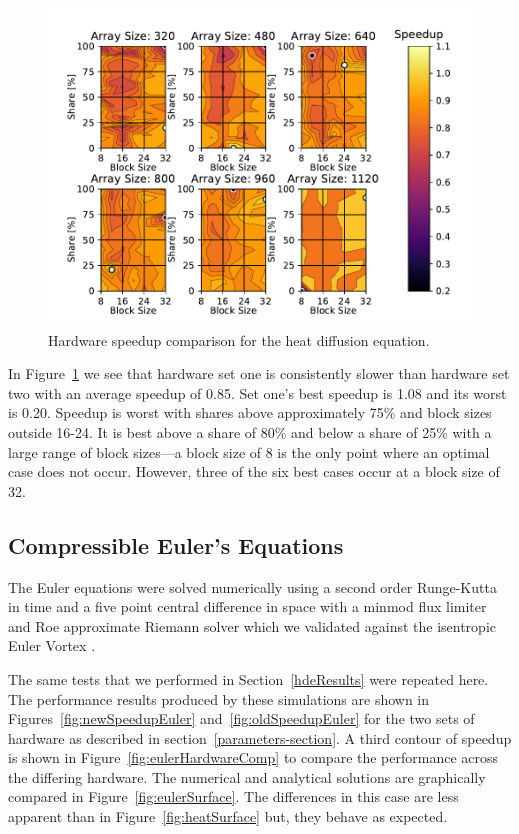 \documentclass[journal,article,submit,moreauthors,pdftex]{Definitions/mdpi}
\newcommand\fs{1}
\begin{document}
\begin{figure}
    \widefigure
    \begin{center}
        \includegraphics[scale=\fs, trim={0.75cm 0.4cm 0.8cm 0.7cm},clip]{figs/hardwareSpeedupheat.pdf}
        \caption{Hardware speedup comparison for the heat diffusion equation.}
        \label{fig:heatHardwareComp}
    \end{center}
\end{figure}
\begin{paracol}{2}
\linenumbers
\switchcolumn

In Figure~\ref{fig:heatHardwareComp} we see that hardware set one is consistently slower than hardware set two with an average speedup of 0.85. Set one's best speedup is 1.08 and its worst is 0.20. Speedup is worst with shares above approximately 75\% and block sizes outside 16-24. It is best above a share of 80\% and below a share of 25\% with a large range of block sizes---a block size of 8 is the only point where an optimal case does not occur. However, three of the six best cases occur at a block size of 32.

\subsection{Compressible Euler's Equations}
\label{eulerVortexResults}
The Euler equations were solved numerically using a second order Runge-Kutta in time and a five point central difference in space with a minmod flux limiter and Roe approximate Riemann solver which we validated against the isentropic Euler Vortex \cite{SpiegelAMethods}.

The same tests that we performed in Section~\ref{hdeResults} were repeated here. The performance results produced by these simulations are shown in Figures~\ref{fig:newSpeedupEuler} and~\ref{fig:oldSpeedupEuler} for the two sets of hardware as described in section~\ref{parameters-section}. A third contour of speedup is shown in Figure~\ref{fig:eulerHardwareComp} to compare the performance across the differing hardware. The numerical and analytical solutions are graphically compared in Figure~\ref{fig:eulerSurface}. The differences in this case are less apparent than in Figure~\ref{fig:heatSurface} but, they behave as expected. 

\end{paracol}
\end{document}
